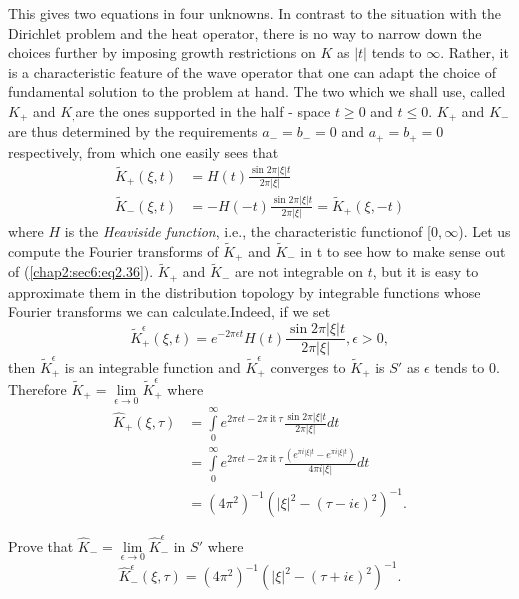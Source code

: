 This gives two equations in four unknowns. In contrast to the situation
with the Dirichlet problem and the heat operator, there is no way to
narrow down the choices further by imposing growth restrictions on $K$
as $|t|$ tends to $\infty$. Rather, it is a characteristic feature of
the wave operator that one can adapt the choice of fundamental
solution to the problem at hand. The two which we shall use, called
$K_+$ and $K_, $are the ones supported in the half - space $t \ge 0$
and $t \le 0$. $K_+$ and $K_-$ are thus determined by the requirements
$a_- = b_- = 0$ and $a_+= b_+ = 0$ respectively, from which one easily
sees that  
\begin{align*}
\tilde{K}_+ (\xi, t) & = H(t) \frac{\sin 2 \pi |\xi| t}{2 \pi |\xi|} \\
\tilde{K}_- (\xi, t) & = -H(-t) \frac{\sin 2 \pi |\xi| t}{2 \pi |\xi|}
= \tilde{K}_+ (\xi, -t)
\end{align*}
where $H$ is the  \textit {Heaviside function}, i.e., the
characteristic function\pageoriginale of [$0, \infty$). Let us compute the Fourier
transforms of $\tilde{K}_+$ and $\tilde{K}_-$ in t to see how to make
sense out of (\ref{chap2:sec6:eq2.36}). $\tilde{K}_+$ and $\tilde{K}_-$ are not
integrable on $t$, but it is easy to approximate them in the
distribution topology by integrable functions whose Fourier transforms
we can calculate.Indeed, if we set 
$$
\tilde{K}^\epsilon_+(\xi, t) = e^{-2 \pi \epsilon t} H(t)
\frac{\sin 2 \pi |\xi| t}{2 \pi |\xi|}, \epsilon > 0,  
$$
then $\tilde{K}^\epsilon_+$ is an integrable function and
$\tilde{K}^\epsilon_+$ converges to $\tilde{K}_+$ is $S'$ as
$\epsilon $ tends to 0. Therefore $\tilde{K}_+ =
\lim\limits_{\epsilon \rightarrow 0} \tilde{K}^\epsilon_+$ where 
\begin{align*}
  \hat{K}_+ (\xi, \tau) & = \int\limits^{\infty}_{0} e^{2 \pi
    \epsilon t- 2 \pi ~\text{it}~ \tau } \frac{\sin 2 \pi|\xi|t}{2\pi
    |\xi|} dt\\ 
  & = \int\limits^{\infty}_{0} e^{2 \pi \epsilon t- 2 \pi ~\text{it}~ \tau }
  \frac{(e^{\pi i |\xi |t}-e ^{\pi i |\xi |t})}{4\pi i |\xi|} dt\\ 
  & = (4 \pi^{2})^{-1} (|\xi|^2-(\tau - i \epsilon )^2)^{-1}.
\end{align*}

\begin{exercise}%
  Prove that $\hat{K}_-= \lim\limits_{\epsilon \rightarrow 0}
  \hat{K}^\epsilon_-$ in $S'$ where 
  $$
  \hat{K}^\epsilon_- (\xi, \tau) = (4 \pi^2)^{-1} (|\xi|^2 - (\tau +
  i\epsilon)^2 )^{-1}. 
  $$
\end{exercise}

